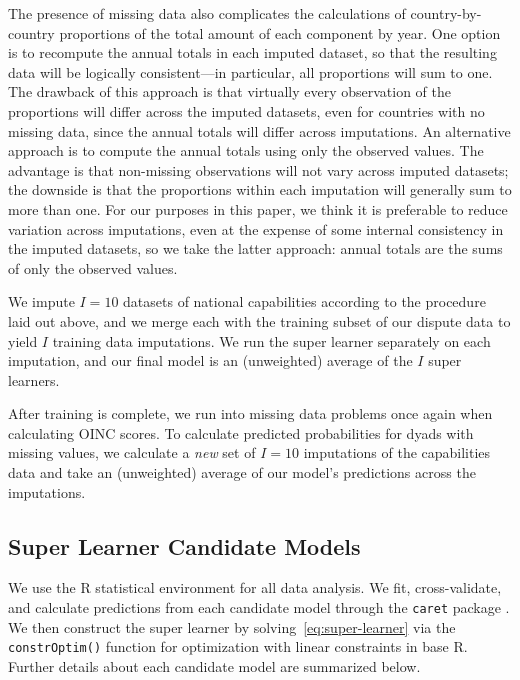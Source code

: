 The presence of missing data also complicates the calculations of country-by-country proportions of the total amount of each component by year.
One option is to recompute the annual totals in each imputed dataset, so that the resulting data will be logically consistent---in particular, all proportions will sum to one.
The drawback of this approach is that virtually every observation of the proportions will differ across the imputed datasets, even for countries with no missing data, since the annual totals will differ across imputations.
An alternative approach is to compute the annual totals using only the observed values.
The advantage is that non-missing observations will not vary across imputed datasets; the downside is that the proportions within each imputation will generally sum to more than one.
For our purposes in this paper, we think it is preferable to reduce variation across imputations, even at the expense of some internal consistency in the imputed datasets, so we take the latter approach: annual totals are the sums of only the observed values.

We impute $I = 10$ datasets of national capabilities according to the procedure laid out above, and we merge each with the training subset of our dispute data to yield $I$ training data imputations.
We run the super learner separately on each imputation, and our final model is an (unweighted) average of the $I$ super learners.

After training is complete, we run into missing data problems once again when calculating OINC scores.
To calculate predicted probabilities for dyads with missing values, we calculate a \emph{new} set of $I = 10$ imputations of the capabilities data and take an (unweighted) average of our model's predictions across the imputations.

\subsection{Super Learner Candidate Models}

We use the R statistical environment \citep{pkg-R} for all data analysis.
We fit, cross-validate, and calculate predictions from each candidate model through the \texttt{caret} package \citep{pkg-caret}.
We then construct the super learner by solving~\eqref{eq:super-learner} via the \texttt{constrOptim()} function for optimization with linear constraints in base R.
Further details about each candidate model are summarized below.

